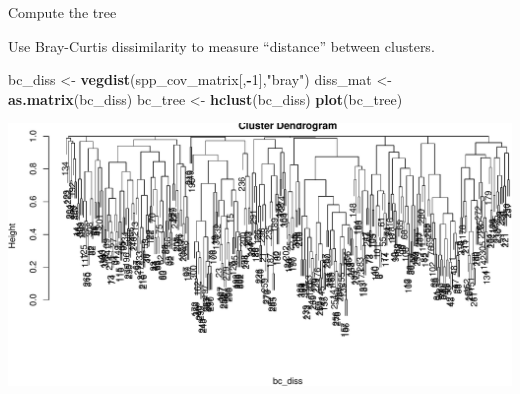 \documentclass[
  ignorenonframetext,
]{beamer}
\newenvironment{Shaded}{\begin{snugshade}}{\end{snugshade}}
\newcommand{\DecValTok}[1]{\textcolor[rgb]{0.00,0.00,0.81}{#1}}
\newcommand{\KeywordTok}[1]{\textcolor[rgb]{0.13,0.29,0.53}{\textbf{#1}}}
\newcommand{\NormalTok}[1]{#1}
\newcommand{\OperatorTok}[1]{\textcolor[rgb]{0.81,0.36,0.00}{\textbf{#1}}}
\newcommand{\StringTok}[1]{\textcolor[rgb]{0.31,0.60,0.02}{#1}}
\begin{document}
\begin{frame}[fragile]{Compute the tree}
\protect\hypertarget{compute-the-tree}{}

Use Bray-Curtis dissimilarity to measure ``distance'' between clusters.
\scriptsize

\begin{Shaded}
\begin{Highlighting}[]
\NormalTok{bc_diss <-}\StringTok{ }\KeywordTok{vegdist}\NormalTok{(spp_cov_matrix[,}\OperatorTok{-}\DecValTok{1}\NormalTok{],}\StringTok{"bray"}\NormalTok{)}
\NormalTok{diss_mat <-}\StringTok{ }\KeywordTok{as.matrix}\NormalTok{(bc_diss)}
\NormalTok{bc_tree <-}\StringTok{ }\KeywordTok{hclust}\NormalTok{(bc_diss)}
\KeywordTok{plot}\NormalTok{(bc_tree)}
\end{Highlighting}
\end{Shaded}

\includegraphics{unsupervised_learning_files/figure-beamer/unnamed-chunk-10-1.pdf}

\end{frame}
\end{document}
